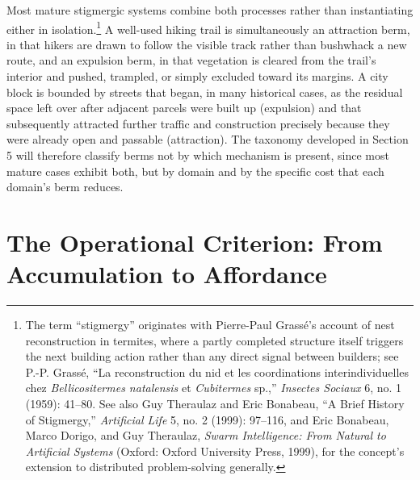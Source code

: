 \documentclass[11pt]{article}
\begin{document}
Most mature stigmergic systems combine both processes rather than instantiating either in isolation.\footnote{The term ``stigmergy'' originates with Pierre-Paul Grass\'{e}'s account of nest reconstruction in termites, where a partly completed structure itself triggers the next building action rather than any direct signal between builders; see P.-P. Grass\'{e}, ``La reconstruction du nid et les coordinations interindividuelles chez \emph{Bellicositermes natalensis} et \emph{Cubitermes} sp.,'' \emph{Insectes Sociaux} 6, no. 1 (1959): 41--80. See also Guy Theraulaz and Eric Bonabeau, ``A Brief History of Stigmergy,'' \emph{Artificial Life} 5, no. 2 (1999): 97--116, and Eric Bonabeau, Marco Dorigo, and Guy Theraulaz, \emph{Swarm Intelligence: From Natural to Artificial Systems} (Oxford: Oxford University Press, 1999), for the concept's extension to distributed problem-solving generally.} A well-used hiking trail is simultaneously an attraction berm, in that hikers are drawn to follow the visible track rather than bushwhack a new route, and an expulsion berm, in that vegetation is cleared from the trail's interior and pushed, trampled, or simply excluded toward its margins. A city block is bounded by streets that began, in many historical cases, as the residual space left over after adjacent parcels were built up (expulsion) and that subsequently attracted further traffic and construction precisely because they were already open and passable (attraction). The taxonomy developed in Section 5 will therefore classify berms not by which mechanism is present, since most mature cases exhibit both, but by domain and by the specific cost that each domain's berm reduces.

\section{The Operational Criterion: From Accumulation to Affordance}
\end{document}

